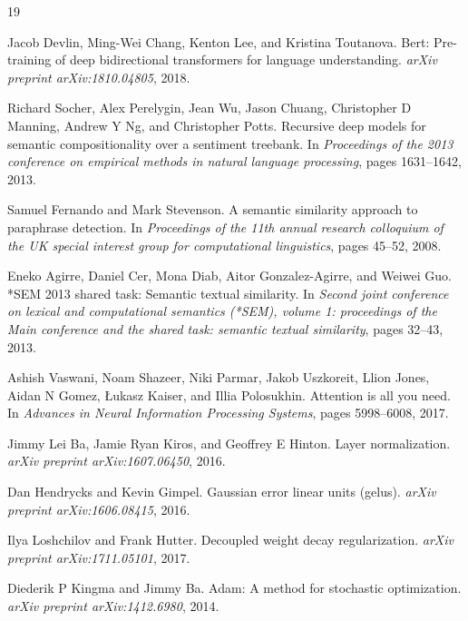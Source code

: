 \documentclass[11pt]{article}
\begin{document}
\begin{thebibliography}{19}
\small

 Jacob Devlin, Ming-Wei Chang, Kenton Lee, and Kristina Toutanova. Bert: Pre-training of deep bidirectional transformers for language understanding. \textit{arXiv preprint arXiv:1810.04805}, 2018.

 Richard Socher, Alex Perelygin, Jean Wu, Jason Chuang, Christopher D Manning, Andrew Y Ng, and Christopher Potts. Recursive deep models for semantic compositionality over a sentiment treebank. In \textit{Proceedings of the 2013 conference on empirical methods in natural language processing}, pages 1631--1642, 2013.

 Samuel Fernando and Mark Stevenson. A semantic similarity approach to paraphrase detection. In \textit{Proceedings of the 11th annual research colloquium of the UK special interest group for computational linguistics}, pages 45--52, 2008.

 Eneko Agirre, Daniel Cer, Mona Diab, Aitor Gonzalez-Agirre, and Weiwei Guo. *SEM 2013 shared task: Semantic textual similarity. In \textit{Second joint conference on lexical and computational semantics (*SEM), volume 1: proceedings of the Main conference and the shared task: semantic textual similarity}, pages 32--43, 2013.

 Ashish Vaswani, Noam Shazeer, Niki Parmar, Jakob Uszkoreit, Llion Jones, Aidan N Gomez, Łukasz Kaiser, and Illia Polosukhin. Attention is all you need. In \textit{Advances in Neural Information Processing Systems}, pages 5998--6008, 2017.

 Jimmy Lei Ba, Jamie Ryan Kiros, and Geoffrey E Hinton. Layer normalization. \textit{arXiv preprint arXiv:1607.06450}, 2016.

 Dan Hendrycks and Kevin Gimpel. Gaussian error linear units (gelus). \textit{arXiv preprint arXiv:1606.08415}, 2016.

 Ilya Loshchilov and Frank Hutter. Decoupled weight decay regularization. \textit{arXiv preprint arXiv:1711.05101}, 2017.

 Diederik P Kingma and Jimmy Ba. Adam: A method for stochastic optimization. \textit{arXiv preprint arXiv:1412.6980}, 2014.


\end{thebibliography}
\end{document}
